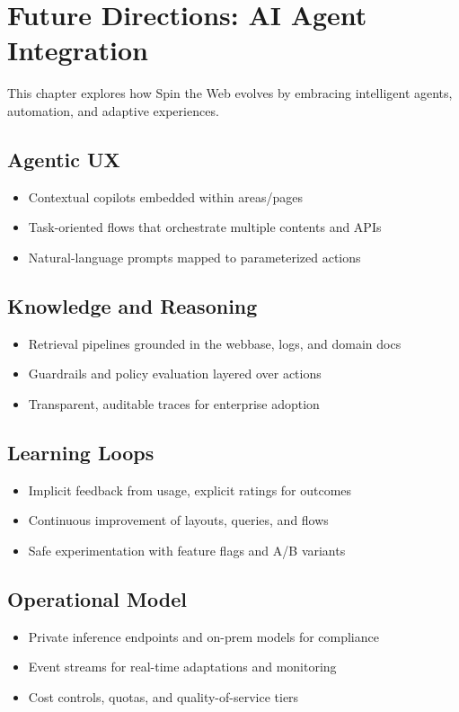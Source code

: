 
\chapter{Future Directions: AI Agent Integration}
\label{chap:future-directions}

This chapter explores how Spin the Web evolves by embracing intelligent agents, automation, and adaptive experiences.

\section{Agentic UX}
\begin{itemize}
	\item Contextual copilots embedded within areas/pages
	\item Task-oriented flows that orchestrate multiple contents and APIs
	\item Natural-language prompts mapped to parameterized actions
\end{itemize}

\section{Knowledge and Reasoning}
\begin{itemize}
	\item Retrieval pipelines grounded in the webbase, logs, and domain docs
	\item Guardrails and policy evaluation layered over actions
	\item Transparent, auditable traces for enterprise adoption
\end{itemize}

\section{Learning Loops}
\begin{itemize}
	\item Implicit feedback from usage, explicit ratings for outcomes
	\item Continuous improvement of layouts, queries, and flows
	\item Safe experimentation with feature flags and A/B variants
\end{itemize}

\section{Operational Model}
\begin{itemize}
	\item Private inference endpoints and on-prem models for compliance
	\item Event streams for real-time adaptations and monitoring
	\item Cost controls, quotas, and quality-of-service tiers
\end{itemize}

